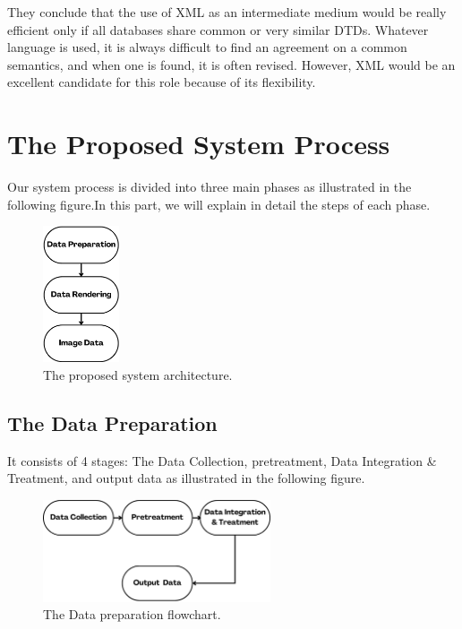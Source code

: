 
\bigbreak
They conclude that the use of XML as an intermediate medium would be really efficient only if all databases share common or very similar DTDs. Whatever language is used, it is always difficult to find an agreement on a common semantics, and when one is found, it is often revised. However, XML would be an excellent candidate for this role because of its flexibility.
\newpage
\section{The Proposed System Process}
Our system process is divided into three main phases as illustrated in the following figure.In this part, we will explain in detail the steps of each phase. 
\begin{figure}[h!]
  \center
  \includegraphics[width=0.20\textwidth]{images/chapter3/systemProcesss.png}
  \caption{The proposed system architecture.}
  \label{fig:system}
\end{figure}
\subsection{The Data Preparation}
It consists of 4 stages: The Data Collection, pretreatment, Data Integration \& Treatment, and output data as illustrated in the following figure. 
\begin{figure}[h!]
  \center
  \includegraphics[width=0.60\textwidth]{images/chapter3/system.png}
  \caption{The Data preparation flowchart.}
  \label{fig:dataprep}
\end{figure}
